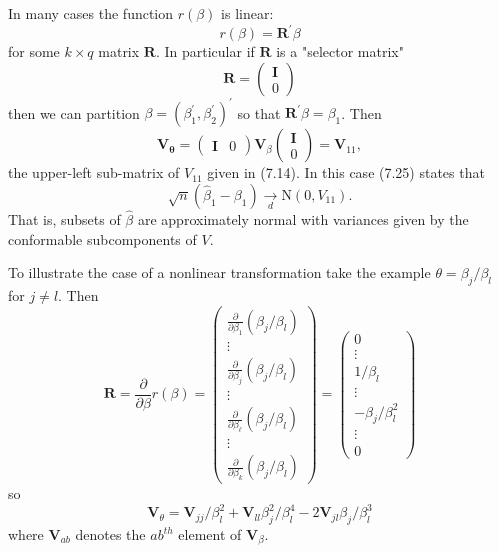 \documentclass[10pt]{article}
\begin{document}
In many cases the function $r(\beta)$ is linear:
$$
r(\beta)=\boldsymbol{R}^{\prime} \beta
$$
for some $k \times q$ matrix $\boldsymbol{R}$. In particular if $\boldsymbol{R}$ is a "selector matrix"
$$
\boldsymbol{R}=\left(\begin{array}{l}
\boldsymbol{I} \\
0
\end{array}\right)
$$
then we can partition $\beta=\left(\beta_{1}^{\prime}, \beta_{2}^{\prime}\right)^{\prime}$ so that $\boldsymbol{R}^{\prime} \beta=\beta_{1}$. Then
$$
\boldsymbol{V}_{\boldsymbol{\theta}}=\left(\begin{array}{ll}
\boldsymbol{I} & 0
\end{array}\right) \boldsymbol{V}_{\beta}\left(\begin{array}{l}
\boldsymbol{I} \\
0
\end{array}\right)=\boldsymbol{V}_{11},
$$
the upper-left sub-matrix of $V_{11}$ given in (7.14). In this case (7.25) states that
$$
\sqrt{n}\left(\widehat{\beta}_{1}-\beta_{1}\right) \underset{d}{\longrightarrow} \mathrm{N}\left(0, V_{11}\right) .
$$
That is, subsets of $\widehat{\beta}$ are approximately normal with variances given by the conformable subcomponents of $V$.

To illustrate the case of a nonlinear transformation take the example $\theta=\beta_{j} / \beta_{l}$ for $j \neq l$. Then
$$
\boldsymbol{R}=\frac{\partial}{\partial \beta} r(\beta)=\left(\begin{array}{c}
\frac{\partial}{\partial \beta_{1}}\left(\beta_{j} / \beta_{l}\right) \\
\vdots \\
\frac{\partial}{\partial \beta_{j}}\left(\beta_{j} / \beta_{l}\right) \\
\vdots \\
\frac{\partial}{\partial \beta_{\ell}}\left(\beta_{j} / \beta_{l}\right) \\
\vdots \\
\frac{\partial}{\partial \beta_{k}}\left(\beta_{j} / \beta_{l}\right)
\end{array}\right)=\left(\begin{array}{c}
0 \\
\vdots \\
1 / \beta_{l} \\
\vdots \\
-\beta_{j} / \beta_{l}^{2} \\
\vdots \\
0
\end{array}\right)
$$
so
$$
\boldsymbol{V}_{\theta}=\boldsymbol{V}_{j j} / \beta_{l}^{2}+\boldsymbol{V}_{l l} \beta_{j}^{2} / \beta_{l}^{4}-2 \boldsymbol{V}_{j l} \beta_{j} / \beta_{l}^{3}
$$
where $\boldsymbol{V}_{a b}$ denotes the $a b^{t h}$ element of $\boldsymbol{V}_{\beta}$.
\end{document}
